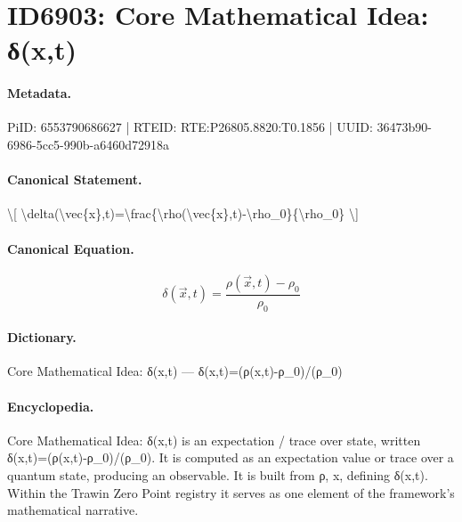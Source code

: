 \section*{ID6903: Core Mathematical Idea: δ(x,t)}
\paragraph{Metadata.}
PiID: 6553790686627 | RTEID: RTE:P26805.8820:T0.1856 | UUID: 36473b90-6986-5cc5-990b-a6460d72918a

\paragraph{Canonical Statement.}
\textbackslash{}[ \textbackslash{}delta(\textbackslash{}vec\{x\},t)=\textbackslash{}frac\{\textbackslash{}rho(\textbackslash{}vec\{x\},t)-\textbackslash{}rho\_0\}\{\textbackslash{}rho\_0\} \textbackslash{}]

\paragraph{Canonical Equation.}
\[
\delta(\vec{x},t)=\frac{\rho(\vec{x},t)-\rho_0}{\rho_0}
\]

\paragraph{Dictionary.}
Core Mathematical Idea: δ(x,t) — δ(x,t)=(ρ(x,t)-ρ\_0)/(ρ\_0)

\paragraph{Encyclopedia.}
Core Mathematical Idea: δ(x,t) is an expectation / trace over state, written δ(x,t)=(ρ(x,t)-ρ\_0)/(ρ\_0). It is computed as an expectation value or trace over a quantum state, producing an observable. It is built from ρ, x, defining δ(x,t). Within the Trawin Zero Point registry it serves as one element of the framework's mathematical narrative.
